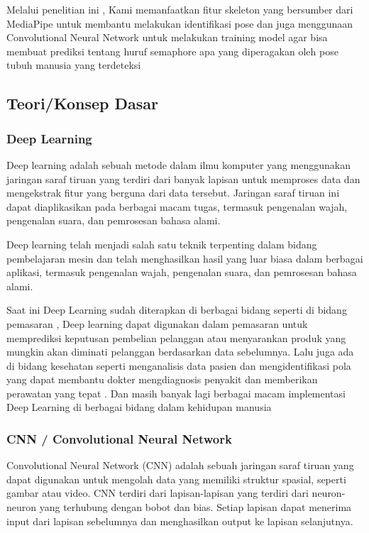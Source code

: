 Melalui penelitian ini , Kami memanfaatkan fitur skeleton yang bersumber dari MediaPipe untuk membantu melakukan identifikasi pose dan juga menggunaan Convolutional Neural Network untuk melakukan training model agar bisa membuat prediksi tentang huruf semaphore apa yang diperagakan oleh pose tubuh manusia yang terdeteksi

\subsection{Teori/Konsep Dasar}

\subsubsection{Deep Learning}

Deep learning adalah sebuah metode dalam ilmu komputer yang menggunakan jaringan saraf tiruan yang terdiri dari banyak lapisan untuk memproses data dan mengekstrak fitur yang berguna dari data tersebut. Jaringan saraf tiruan ini dapat diaplikasikan pada berbagai macam tugas, termasuk pengenalan wajah, pengenalan suara, dan pemrosesan bahasa alami.

Deep learning telah menjadi salah satu teknik terpenting dalam bidang pembelajaran mesin dan telah menghasilkan hasil yang luar biasa dalam berbagai aplikasi, termasuk pengenalan wajah, pengenalan suara, dan pemrosesan bahasa alami.

Saat ini Deep Learning sudah diterapkan di berbagai bidang seperti di bidang pemasaran , Deep learning dapat digunakan dalam pemasaran untuk memprediksi keputusan pembelian pelanggan atau menyarankan produk yang mungkin akan diminati pelanggan berdasarkan data sebelumnya. Lalu juga ada di bidang kesehatan seperti  menganalisis data pasien dan mengidentifikasi pola yang dapat membantu dokter mengdiagnosis penyakit dan memberikan perawatan yang tepat . Dan masih banyak lagi berbagai macam implementasi Deep Learning di berbagai bidang dalam kehidupan manusia 

\subsubsection{CNN / Convolutional Neural Network}
Convolutional Neural Network (CNN) adalah sebuah jaringan saraf tiruan yang dapat digunakan untuk mengolah data yang memiliki struktur spasial, seperti gambar atau video. CNN terdiri dari lapisan-lapisan yang terdiri dari neuron-neuron yang terhubung dengan bobot dan bias. Setiap lapisan dapat menerima input dari lapisan sebelumnya dan menghasilkan output ke lapisan selanjutnya.

